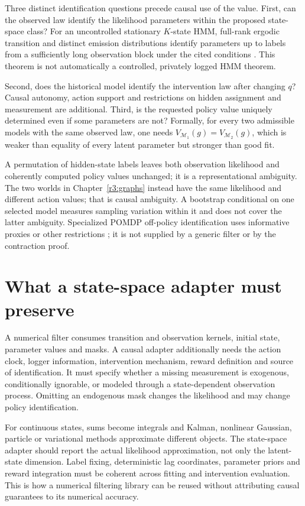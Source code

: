 Three distinct identification questions precede causal use of the value.
First, can the observed law identify the likelihood parameters within
the proposed state-space class? For an uncontrolled stationary $K$-state
HMM, full-rank ergodic transition and distinct emission distributions
identify parameters up to labels from a sufficiently long observation
block under the cited conditions
\citep[Theorem 1]{hmmident2016}. This theorem is not automatically a
controlled, privately logged HMM theorem.

Second, does the historical model identify the intervention law after
changing $q$? Causal autonomy, action support and restrictions on hidden
assignment and measurement are additional. Third, is the requested
policy value uniquely determined even if some parameters are not?
Formally, for every two admissible models with the same observed law,
one needs $V_{\mathcal M_1}(g)=V_{\mathcal M_2}(g)$, which is weaker
than equality of every latent parameter but stronger than good fit.

A permutation of hidden-state labels leaves both observation likelihood
and coherently computed policy values unchanged; it is a representational
ambiguity. The two worlds in Chapter~\ref{r3:graphs} instead have the
same likelihood and different action values; that is causal ambiguity.
A bootstrap conditional on one selected model measures sampling
variation within it and does not cover the latter ambiguity. Specialized
POMDP off-policy identification uses informative proxies or other
restrictions \citep{tennenholtz2020}; it is not supplied by a generic
filter or by the contraction proof.

\section{What a state-space adapter must preserve}
\label{r3:state-contract}
A numerical filter consumes transition and observation kernels, initial
state, parameter values and masks. A causal adapter additionally needs
the action clock, logger information, intervention mechanism, reward
definition and source of identification. It must specify whether a
missing measurement is exogenous, conditionally ignorable, or modeled
through a state-dependent observation process. Omitting an endogenous
mask changes the likelihood and may change policy identification.

For continuous states, sums become integrals and Kalman, nonlinear
Gaussian, particle or variational methods approximate different objects.
The state-space adapter should report the actual likelihood approximation,
not only the latent-state dimension. Label fixing, deterministic lag
coordinates, parameter priors and reward integration must be coherent
across fitting and intervention evaluation. This is how a numerical
filtering library can be reused without attributing causal guarantees
to its numerical accuracy.

